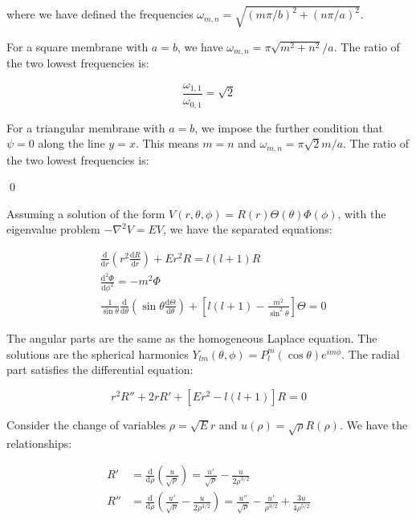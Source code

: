 \documentclass[12pt]{article}
\begin{document}
where we have defined the frequencies $\omega_{m, n} = \sqrt{(m \pi/b)^{2} + (n \pi/a)^{2}}$.

For a square membrane with $a = b$, we have $\omega_{m, n} = \pi \sqrt{m^{2} + n^{2}}/a$. The ratio of the two lowest frequencies is:

\begin{equation}
    \frac{\omega_{1, 1}}{\omega_{0, 1}} = \sqrt{2}
\end{equation}

For a triangular membrane with $a = b$, we impose the further condition that $\psi = 0$ along the line $y = x$. This means $m = n$ and $\omega_{m, n} = \pi \sqrt{2} m/a$. The ratio of the two lowest frequencies is:

\qed



Assuming a solution of the form $V(r, \theta, \phi) = R(r) \Theta(\theta) \Phi(\phi)$, with the eigenvalue problem $-\nabla^{2}V = EV$, we have the separated equations:

\begin{equation}
\begin{split}
    &\frac{\mathrm{d}}{\mathrm{d}r} \left( r^2 \frac{\mathrm{d}R}{\mathrm{d}r} \right) + E r^{2} R = l(l+1)R \\
    &\frac{\mathrm{d}^{2} \Phi}{\mathrm{d} \phi^2} = -m^2 \Phi \\
    &\frac{1}{\sin{\theta}} \frac{\mathrm{d}}{\mathrm{d} \theta} \left( \sin{\theta} \frac{\mathrm{d} \Theta}{\mathrm{d} \theta} \right) + \left[ l(l+1) - \frac{m^2}{\sin^{2}{\theta}} \right] \Theta = 0
\end{split}
\end{equation}

The angular parts are the same as the homogeneous Laplace equation. The solutions are the spherical harmonics $Y_{lm}(\theta, \phi) = P_{l}^{m}(\cos{\theta}) e^{im\phi}$. The radial part satisfies the differential equation:

\begin{equation}
    r^{2} R'' + 2r R' + [E r^{2} - l(l+1)] R = 0
\end{equation}

Consider the change of variables $\rho = \sqrt{E} r$ and $u(\rho) = \sqrt{\rho} R(\rho)$. We have the relationships:

\begin{equation}
\begin{split}
    R' &= \frac{\mathrm{d}}{\mathrm{d}\rho} \left( \frac{u}{\sqrt{\rho}} \right) = \frac{u'}{\sqrt{\rho}} - \frac{u}{2\rho^{3/2}} \\
    R'' &= \frac{\mathrm{d}}{\mathrm{d}\rho} \left( \frac{u'}{\sqrt{\rho}} - \frac{u}{2\rho^{3/2}} \right) = \frac{u''}{\sqrt{\rho}} - \frac{u'}{\rho^{3/2}} + \frac{3u}{4\rho^{5/2}}    
\end{split}
\end{equation}
\end{document}
